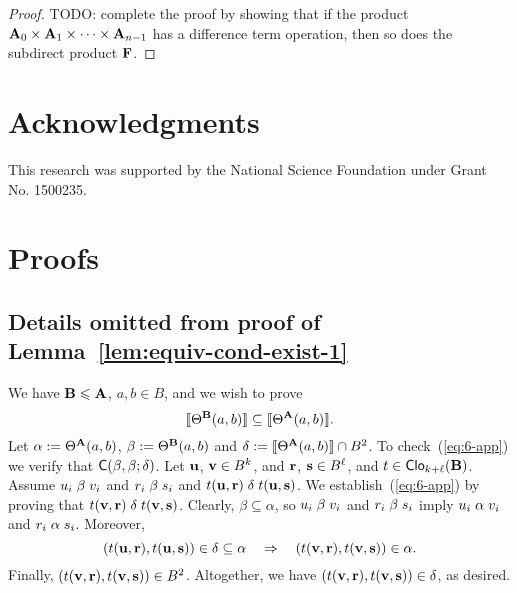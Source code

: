 \begin{proof}
  \medskip

  \noindent TODO: complete the proof by showing that if the product 
  $\mathbf{A}_0 \times \mathbf{A}_1 \times \cdots \times \mathbf{A}_{n-1}$ has a difference term operation,
  then so does the subdirect product $\mathbf{F}$.

  \medskip

\end{proof}




\section*{Acknowledgments}
This research was supported by the National Science 
Foundation under Grant No. 1500235.




\appendix
\section{Proofs}
\subsection{Details omitted from proof of Lemma~\ref{lem:equiv-cond-exist-1}}
\label{sec:details-omitted-from}
We have $\mathbf{B} \leqslant \mathbf{A}$, $a, b \in B$, and we wish to prove
\begin{equation}
    \label{eq:6-app}
    \com{\Cg^{\bB} (a, b)} \subseteq \com{\Cg^{\bA} (a, b)}.
\end{equation}
Let $\alpha := \Theta^{\mathbf{A}} (a, b)$, $\beta := \Theta^{\mathbf{B}} (a, b)$ and
$\delta:=\llbracket \Theta^{\mathbf{A}} (a, b) \rrbracket \cap B^2$. 
To check~(\ref{eq:6-app}) we verify that $\mathsf{C}(\beta, \beta; \delta)$.
Let $\mathbf{u}$, $\mathbf{v} \in B^{k}$, and $\mathbf{r}$, $\mathbf{s} \in B^{\ell}$, and
$t\in \operatorname{\mathsf{Clo}}_{k+\ell}(\mathbf{B})$.  Assume
$u_i \mathrel{\beta} v_i$ and $r_i \mathrel{\beta} s_i$
and $t(\mathbf{u}, \mathbf{r}) \mathrel{\delta} t(\mathbf{u}, \mathbf{s})$.
We establish~(\ref{eq:6-app}) by proving that
$t(\mathbf{v}, \mathbf{r}) \mathrel{\delta} t(\mathbf{v}, \mathbf{s})$.
Clearly,
$\beta \subseteq \alpha$, so 
$u_i \mathrel{\beta} v_i$ and $r_i \mathrel{\beta} s_i$ imply
$u_i \mathrel{\alpha} v_i$ and $r_i \mathrel{\alpha} s_i$.  Moreover,
\[
(t(\mathbf{u}, \mathbf{r}), t(\mathbf{u}, \mathbf{s})) \in
\delta \subseteq \alpha \quad \Rightarrow \quad
(t(\mathbf{v}, \mathbf{r}), t(\mathbf{v}, \mathbf{s})) \in \alpha.
\]
Finally, 
$(t(\mathbf{v}, \mathbf{r}), t(\mathbf{v}, \mathbf{s})) \in B^2$. Altogether, we have
$(t(\mathbf{v}, \mathbf{r}), t(\mathbf{v}, \mathbf{s})) \in \delta$, as desired.


